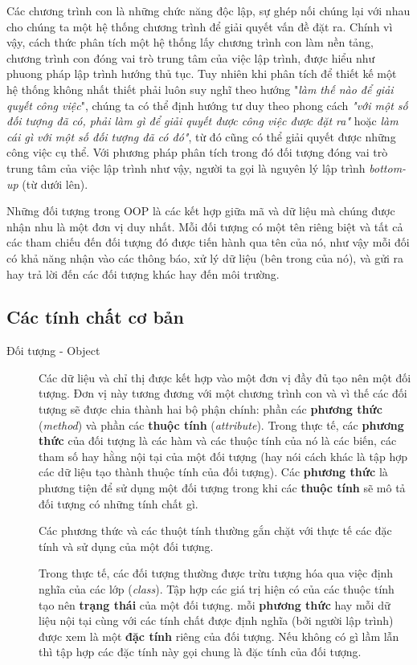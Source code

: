 \documentclass[10pt, a4paper]{article}
\begin{document}
Các chương trình con là những chức năng độc lập, sự ghép nối chúng lại với nhau cho chúng ta một hệ thống chương trình để giải quyết vấn đề đặt ra. Chính vì vậy, cách thức phân tích một hệ thống lấy chương trình con làm nền tảng, chương trình con đóng vai trò trung tâm của việc lập trình, được hiểu như phuong pháp lập trình hướng thủ tục. Tuy nhiên khi phân tích để thiết kế một hệ thống không nhất thiết phải luôn suy nghĩ theo hướng "\emph{làm thế nào để giải quyết công việc}", chúng ta có thể định hướng tư duy theo phong cách \emph{"với một số đối tượng đã có, phải làm gì để giải quyết được công việc được đặt ra"} hoặc \emph{làm cái gì với một số đối tượng đã có đó"}, từ đó cũng có thể giải quyết được những công việc cụ thể. Với phương pháp phân tích trong đó đối tượng đóng vai trò trung tâm của việc lập trình như vậy, người ta gọi là nguyên lý lập trình \emph{bottom-up} (từ dưới lên).

Những đối tượng trong OOP là các kết hợp giữa mã và dữ liệu mà chúng được nhận nhu là một đơn vị duy nhất. Mỗi đối tượng có một tên riêng biệt và tất cả các tham chiếu đến đối tượng đó được tiến hành qua tên của nó, như vậy mỗi đối có khả năng nhận vào các thông báo, xử lý dữ liệu (bên trong của nó), và gửi ra hay trả lời đến các đối tượng khác hay đến môi trường.

\subsection{Các tính chất cơ bản}

\begin{description}
\item[Đối tượng - Object] Các dữ liệu và chỉ thị được kết hợp vào một đơn vị đầy đủ tạo nên một đối tượng. Đơn vị này tương đương với một chương trình con và vì thế các đối tượng sẽ được chia thành hai bộ phận chính: phần các \textbf{phương thức} (\emph{method}) và phần các \textbf{thuộc tính} (\emph{attribute}). Trong thực tế, các \textbf{phương thức} của đối tượng là các hàm và các thuộc tính của nó là các biến, các tham số hay hằng nội tại của một đối tượng (hay nói cách khác là tập hợp các dữ liệu tạo thành thuộc tính của đối tượng). Các \textbf{phương thức} là phương tiện để sử dụng một đối tượng trong khi các \textbf{thuộc tính} sẽ mô tả đối tượng có những tính chất gì.

Các phương thức và các thuột tính thường gắn chặt với thực tế các đặc tính và sử dụng của một đối tượng.

Trong thực tế, các đối tượng thường được trừu tượng hóa qua việc định nghĩa của các lớp (\emph{class}). Tập hợp các giá trị hiện có của các thuộc tính tạo nên \textbf{trạng thái} của một đối tượng.
mỗi {\bf phương thức} hay mỗi dữ liệu nội tại cùng với các tính chất được định nghĩa (bởi người lập trình) được xem là một {\bf đặc tính} riêng của đối tượng. Nếu không có gì lầm lẫn thì tập hợp các đặc tính này gọi chung là đặc tính của đối tượng.
\end{description}
\end{document}
